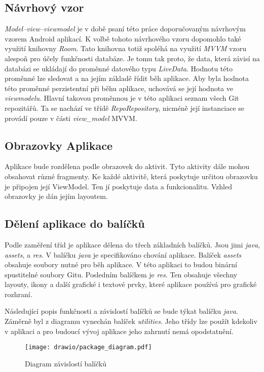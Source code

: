         \subsection{Návrhový vzor}
        \emph{Model–view–viewmodel} je v době psaní této práce doporučovaným návrhovým vzorem Android aplikací. K volbě tohoto návrhového vzoru dopomohlo také využití knihovny \emph{Room}. Tato knihovna totiž spoléhá na využití \emph{MVVM} vzoru alespoň pro účely funkčnosti databáze. Je tomu tak proto, že data, která závisí na databázi se ukládají do proměnné datového typu \emph{LiveData}. Hodnotu této proměnné lze sledovat a na jejím základě řídit běh aplikace. Aby byla hodnota této proměnné perzistentní při běhu aplikace, uchovává se její hodnota ve \emph{viewmodelu}. Hlavní takovou proměnnou je v této aplikaci seznam všech Git repozitářů. Ta se nachází ve třídě \emph{RepoRepository}, nicméně její instanciace se provádí pouze v části \emph{view\_model} MVVM.
        
        \subsection{Obrazovky Aplikace}
        Aplikace bude rozdělena podle obrazovek do aktivit. Tyto aktivity dále mohou obsahovat různé fragmenty. Ke každé aktivitě, která poskytuje určitou obrazovku je připojen její ViewModel. Ten jí poskytuje data a funkcionalitu. Vzhled obrazovky je dán jejím layoutem.

        \newpage
        \subsection{Dělení aplikace do balíčků}
        Podle zaměření tříd je aplikace dělena do třech základních balíčků. Jsou jimi \emph{java}, \emph{assets}, a \emph{res}. V balíčku \emph{java} je specifikováno chování aplikace. Balíček \emph{assets} obsahuje soubory nutné pro běh aplikace. V této aplikaci to budou binární spustitelné soubory Gitu. Posledním balíčkem je \emph{res}. Ten obsahuje všechny layouty, ikony a další grafické i textové prvky, které aplikace používá pro grafické rozhraní.

        Následující popis funkčnosti a závislostí balíčků se bude týkat balíčku \emph{java}. Záměrně byl z diagramu vynechán balíček \emph{utilities}. Jeho třídy lze použít kdekoliv v aplikaci a pro budoucí vývoj aplikace jeho zahrnutí nemá opodstatnění.

        \begin{figure}[h]
            \centering
            \vspace{0.5cm}
            \texttt{[image: drawio/package\_diagram.pdf]}
            \caption[Diagram závislostí balíčků]{Diagram závislostí balíčků}
            \label{diagram:packages}
        \end{figure}

